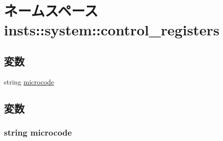 \hypertarget{namespaceinsts_1_1system_1_1control__registers}{
\section{ネームスペース insts::system::control\_\-registers}
\label{namespaceinsts_1_1system_1_1control__registers}
}
\subsection*{変数}
\begin{DoxyCompactItemize}
\item 
string \hyperlink{namespaceinsts_1_1system_1_1control__registers_a770f11a173e99389a8802f0107ed8f52}{microcode}
\end{DoxyCompactItemize}


\subsection{変数}
\hypertarget{namespaceinsts_1_1system_1_1control__registers_a770f11a173e99389a8802f0107ed8f52}{
\subsubsection[{microcode}]{\setlength{\rightskip}{0pt plus 5cm}string {\bf microcode}}}
\label{namespaceinsts_1_1system_1_1control__registers_a770f11a173e99389a8802f0107ed8f52}
